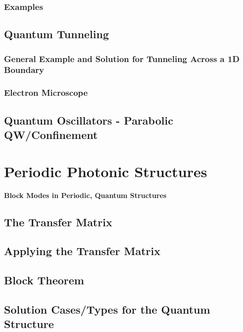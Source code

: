 \documentclass[colorlinks,11pt,a4paper,normalphoto,withhyper,ragged2e]{altareport}
\renewcommand{\ReportSectionFont}{\LARGE\rmfamily\bfseries} %
\begin{document}
		
		\subsubsection{Examples}
		
		
	\subsection{Quantum Tunneling}
	
		\subsubsection{General Example and Solution for Tunneling Across a 1D Boundary}
		
		
		\subsubsection{Electron Microscope}
		
		
	\subsection{Quantum Oscillators - Parabolic QW/Confinement}
	
	
	\pagebreak
	
	
	
	
\section{Periodic Photonic Structures}\vskip0pt
	{\quad\quad\color{heading}\ReportSectionFont{Block Modes in Periodic, Quantum Structures}}
		
	\subsection{The Transfer Matrix}
	
	
	\subsection{Applying the Transfer Matrix}
	
	
	\subsection{Block Theorem}
	
	
	\subsection{Solution Cases/Types for the Quantum Structure}
	
\end{document}
